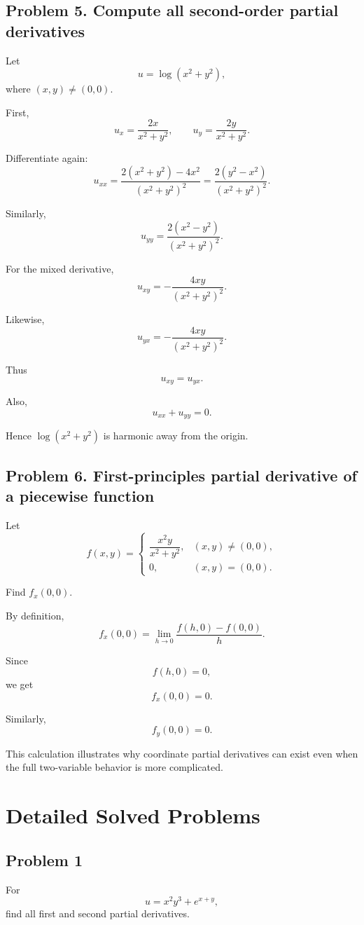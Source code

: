\documentclass[11pt,oneside]{book}
\theoremstyle{studentthm}
\theoremstyle{definition}
\begin{document}
\subsection*{Problem 5. Compute all second-order partial derivatives}

Let
\[
u=\log(x^2+y^2),
\]
where \((x,y)\ne(0,0)\).

First,
\[
u_x
=
\frac{2x}{x^2+y^2},
\qquad
u_y
=
\frac{2y}{x^2+y^2}.
\]

Differentiate again:
\[
u_{xx}
=
\frac{
2(x^2+y^2)-4x^2
}{
(x^2+y^2)^2
}
=
\frac{2(y^2-x^2)}{(x^2+y^2)^2}.
\]

Similarly,
\[
u_{yy}
=
\frac{2(x^2-y^2)}{(x^2+y^2)^2}.
\]

For the mixed derivative,
\[
u_{xy}
=
-\frac{4xy}{(x^2+y^2)^2}.
\]

Likewise,
\[
u_{yx}
=
-\frac{4xy}{(x^2+y^2)^2}.
\]

Thus
\[
u_{xy}=u_{yx}.
\]

Also,
\[
u_{xx}+u_{yy}=0.
\]

Hence \(\log(x^2+y^2)\) is harmonic away from the origin.

\subsection*{Problem 6. First-principles partial derivative of a piecewise function}

Let
\[
f(x,y)
=
\begin{cases}
\dfrac{x^2y}{x^2+y^2},&(x,y)\ne(0,0),\\
0,&(x,y)=(0,0).
\end{cases}
\]

Find \(f_x(0,0)\).

By definition,
\[
f_x(0,0)
=
\lim_{h\to0}
\frac{f(h,0)-f(0,0)}{h}.
\]

Since
\[
f(h,0)=0,
\]
we get
\[
f_x(0,0)=0.
\]

Similarly,
\[
f_y(0,0)=0.
\]

This calculation illustrates why coordinate partial derivatives can
exist even when the full two-variable behavior is more complicated.


\section{Detailed Solved Problems}

\subsection*{Problem 1}
For
\[
u=x^2y^3+e^{x+y},
\]
find all first and second partial derivatives.
\end{document}
